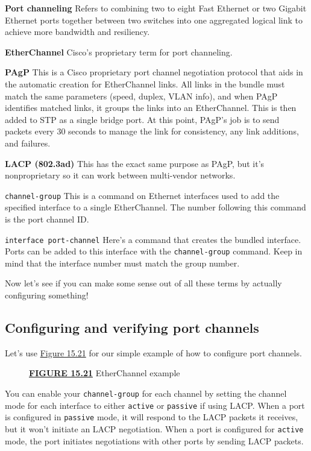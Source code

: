 \textbf{Port channeling} Refers to combining two to eight Fast Ethernet
or two Gigabit Ethernet ports together between two switches into one
aggregated logical link to achieve more bandwidth and resiliency.

\textbf{EtherChannel} Cisco's proprietary term for port channeling.

\textbf{PAgP} This is a Cisco proprietary port channel negotiation
protocol that aids in the automatic creation for EtherChannel links. All
links in the bundle must match the same parameters (speed, duplex, VLAN
info), and when PAgP identifies matched links, it groups the links into
an EtherChannel. This is then added to STP as a single bridge port. At
this point, PAgP's job is to send packets every 30 seconds to manage the
link for consistency, any link additions, and failures.

\textbf{LACP (802.3ad)} This has the exact same purpose as PAgP, but
it's nonproprietary so it can work between multi-vendor networks.

\texttt{channel-group} This is a command on Ethernet interfaces used to
add the specified interface to a single EtherChannel. The number
following this command is the port channel ID.

\texttt{interface\ port-channel} Here's a command that creates the
bundled interface. Ports can be added to this interface with the
\texttt{channel-group} command. Keep in mind that the interface number
must match the group number.

Now let's see if you can make some sense out of all these terms by
actually configuring something!

\subsection{Configuring and verifying port channels}

Let's use \protect\hyperlink{c15.xhtmlux5cux23figure15-21}{Figure 15.21}
for our simple example of how to configure port channels.

\begin{figure}
\centering
\caption{{\protect\hyperlink{c15.xhtmlux5cux23figureanchor15-21}{\textbf{FIGURE
15.21}} EtherChannel example}}
\end{figure}

You can enable your
\texttt{channel-group} for each channel by setting the channel mode for
each interface to either \texttt{active} or \texttt{passive} if using
LACP. When a port is configured in \texttt{passive} mode, it will
respond to the LACP packets it receives, but it won't initiate an LACP
negotiation. When a port is configured for \texttt{active} mode, the
port initiates negotiations with other ports by sending LACP packets.

